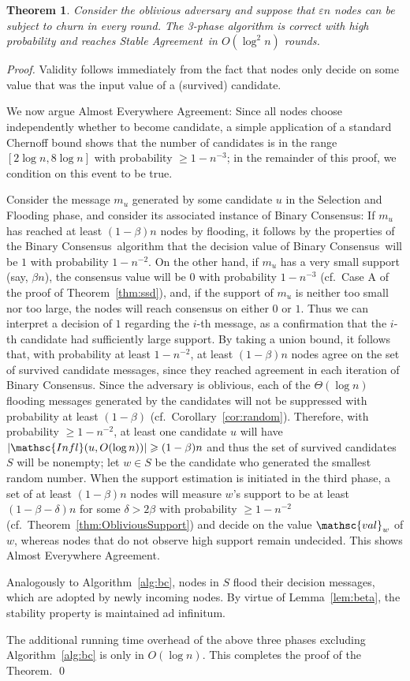 \documentclass[leqno,11pt]{article}
\newtheorem{theorem}{Theorem}[section]
\renewcommand{\ge}{\geqslant}
\newcommand{\eps}{\varepsilon}
\newcommand{\infl}{{\mathsc{Infl}}}
\newcommand{\val}{{\mathsc{val}}}
\newcommand{\sa}{{\sc Stable Agreement}}
\newcommand{\bc}{{\sc Binary Consensus}}
\begin{document}
\begin{theorem}\label{thm:sa}
Consider the oblivious adversary and suppose that $\eps n$
nodes can be subject to churn in every round. The 3-phase
algorithm is correct with high probability and reaches \sa\ in $O(\log^2 n)$
rounds.
\end{theorem}
\begin{proof}
  Validity follows immediately from the fact that nodes only decide on some value that was the input value of a (survived) candidate.

  We now argue Almost Everywhere Agreement:
  Since all nodes choose independently whether to become candidate, a simple application of a standard Chernoff bound shows that the number of candidates is in the range $[2\log n,8\log n]$ with probability $\ge 1-n^{-3}$; in the remainder of this proof, we condition on this event to be true.

  Consider the message $m_u$ generated by some candidate $u$ in the Selection and Flooding phase, and consider its associated instance of \bc:
If $m_u$ has reached at least $(1-\beta)n$ nodes by flooding, it follows by the properties of the \bc\ algorithm that the decision value of \bc\ will be $1$ with probability $1-n^{-2}$.
On the other hand, if $m_u$ has a very small support (say, $\beta n$), the consensus value will be
$0$ with probability $1-n^{-3}$ (cf.\ Case A of the proof of Theorem~\ref{thm:ssd}),
  and, if the support of $m_u$ is neither too small nor too large, the nodes
  will reach consensus on either $0$ or $1$. 
  Thus we can interpret a decision of $1$ regarding the $i$-th message, as a confirmation that the $i$-th candidate had sufficiently large support.
  By taking a union bound, it follows that, with probability at least $1-n^{-2}$, at least $(1-\beta) n$ nodes agree
  on the set of survived candidate messages, since they reached agreement in each iteration of \bc.
Since the adversary is oblivious, each of
the $\Theta(\log n)$ flooding messages generated by the candidates will not be suppressed with probability at least $(1 - \beta)$ (cf.\ Corollary~\ref{cor:random}).
Therefore, with probability $\ge 1 - n^{-2}$, at least one candidate $u$ will have $|\infl(u, O(\log n))| \ge (1 - \beta) n$ and thus the set of survived candidates $S$ will be nonempty; let $w \in S$ be the candidate who generated the smallest random number.
When the support estimation is initiated in the third phase, a set of at least
$(1-\beta)n$ nodes will measure $w$'s support to be at least $(1-\beta - \delta)n$
for some $\delta > 2\beta$ with probability $\ge 1 - n^{-2}$ (cf.\
Theorem~\ref{thm:ObliviousSupport}) and decide on the value $\val_w$ of $w$,
whereas nodes that do not observe high support remain undecided.
This shows Almost Everywhere Agreement. 

Analogously to Algorithm~\ref{alg:bc}, nodes in $S$ flood their decision
messages, which are adopted by newly incoming nodes. By virtue of
Lemma~\ref{lem:beta}, the stability property is maintained ad infinitum.

The additional running time overhead of the above three phases excluding 
Algorithm~\ref{alg:bc} is only in $O(\log n)$. This completes the proof of the Theorem.
\qed
\end{proof}
\end{document}
